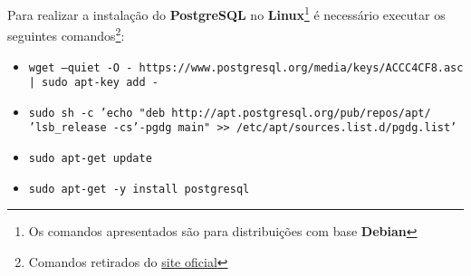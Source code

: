 
Para realizar a instalação do \textbf{PostgreSQL} no \textbf{Linux}\footnote{Os comandos apresentados são para distribuições com base \textbf{Debian}} é necessário executar os seguintes comandos\footnote{Comandos retirados do \href{https://www.postgresql.org/download/linux/debian/}{site oficial}}:


\begin{itemize}
	\item \texttt{wget --quiet -O - https://www.postgresql.org/media/keys/ACCC4CF8.asc | sudo apt-key add -}
	\item \texttt{sudo sh -c 'echo "deb http://apt.postgresql.org/pub/repos/apt/ 'lsb_release -cs'-pgdg main" >> /etc/apt/sources.list.d/pgdg.list'}
	\item \texttt{sudo apt-get update}
	\item \texttt{sudo apt-get -y install postgresql}
\end{itemize}
